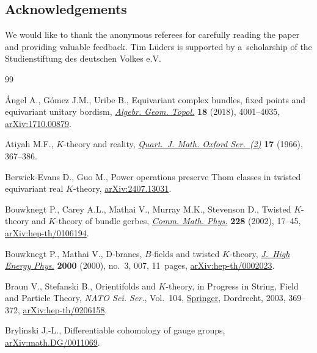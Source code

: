 \documentclass[pdftex]{sigma}
\numberwithin{equation}{section}
\begin{document}
\subsection*{Acknowledgements}
We would like to thank the anonymous referees for carefully reading the paper and providing valuable feedback.
Tim L\"uders is supported by a~scholarship of the Studienstiftung des deutschen Volkes e.V.

\begin{thebibliography}{99}
\footnotesize\itemsep=-0.8pt

{\'A}ngel A., G\'omez J.M., Uribe B., Equivariant complex bundles, fixed points
 and equivariant unitary bordism,
 \href{https://doi.org/10.2140/agt.2018.18.4001}{\textit{Algebr. Geom.
 Topol.}} \textbf{18} (2018), 4001--4035,
 \href{http://arxiv.org/abs/1710.00879}{arXiv:1710.00879}.

Atiyah M.F., {$K$}-theory and reality,
 \href{https://doi.org/10.1093/qmath/17.1.367}{\textit{Quart.~J. Math. Oxford
 Ser.~(2)}} \textbf{17} (1966), 367--386.

Berwick-Evans D., Guo M., Power operations preserve {T}hom classes in twisted
 equivariant real {$K$}-theory,
 \href{http://arxiv.org/abs/2407.13031}{arXiv:2407.13031}.

Bouwknegt P., Carey A.L., Mathai V., Murray M.K., Stevenson D., Twisted
 {$K$}-theory and {$K$}-theory of bundle gerbes,
 \href{https://doi.org/10.1007/s002200200646}{\textit{Comm. Math. Phys.}}
 \textbf{228} (2002), 17--45,
 \href{http://arxiv.org/abs/hep-th/0106194}{arXiv:hep-th/0106194}.

Bouwknegt P., Mathai V., D-branes, {$B$}-fields and twisted {$K$}-theory,
 \href{https://doi.org/10.1088/1126-6708/2000/03/007}{\textit{J.~High Energy
 Phys.}} \textbf{2000} (2000), no.~3, 007, 11~pages,
 \href{http://arxiv.org/abs/hep-th/0002023}{arXiv:hep-th/0002023}.

Braun V., Stefanski B., Orientifolds and {$K$}-theory, in Progress in {S}tring,
 {F}ield and {P}article {T}heory, \textit{NATO Sci. Ser.}, Vol.~104,
 \href{https://doi.org/10.1007/978-94-010-0211-0_16}{Springer}, Dordrecht,
 2003, 369--372,
 \href{http://arxiv.org/abs/hep-th/0206158}{arXiv:hep-th/0206158}.

Brylinski J.-L., Differentiable cohomology of gauge groups,
 \href{http://arxiv.org/abs/math.DG/0011069}{arXiv:math.DG/0011069}.


\end{thebibliography}
\end{document}

